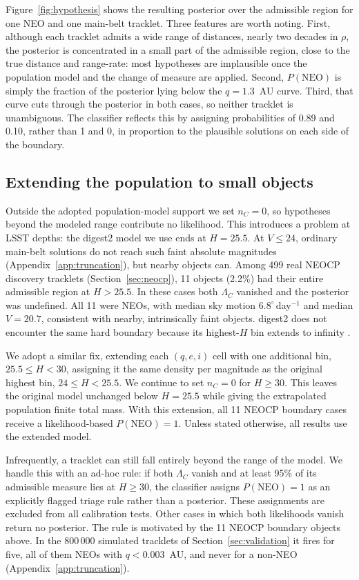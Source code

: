 \documentclass[linenumbers,twocolumn]{aastex701}
\begin{document}
Figure~\ref{fig:hypothesis} shows the resulting posterior over the
admissible region for one NEO and one main-belt tracklet. Three features
are worth noting. First, although each tracklet admits a wide range of
distances, nearly two decades in $\rho$, the posterior is concentrated in
a small part of the admissible region, close to the true distance and
range-rate: most hypotheses are implausible once the population model and
the change of measure are applied. Second, $P(\mathrm{NEO})$ is simply the
fraction of the posterior lying below the $q=1.3$~AU curve. Third, that
curve cuts through the posterior in both cases, so neither tracklet is
unambiguous. The classifier reflects this by assigning probabilities of
0.89 and 0.10, rather than 1 and 0, in proportion to the plausible
solutions on each side of the boundary.

\subsection{Extending the population to small objects}
\label{sec:truncation}

Outside the adopted population-model support we set $n_C=0$, so hypotheses beyond
the modeled range contribute no likelihood. This introduces a problem at LSST depths: the digest2 model we use ends at $H=25.5$.
At $V\le24$, ordinary main-belt solutions do not reach such faint absolute
magnitudes (Appendix~\ref{app:truncation}), but nearby objects can. Among 499
real NEOCP discovery tracklets (Section~\ref{sec:neocp}), 11 objects (2.2\%)
had their entire admissible region at $H>25.5$. In these cases both
$\Lambda_C$ vanished and the posterior was undefined. All 11 were NEOs, with
median sky motion $6.8^\circ$\,day$^{-1}$ and median $V=20.7$, consistent
with nearby, intrinsically faint objects. digest2 does not encounter the same
hard boundary because its highest-$H$ bin extends to infinity
\citep{keys2019}.

We adopt a similar fix, extending each $(q,e,i)$ cell with one additional bin,
$25.5\le H<30$, assigning it the same density per magnitude as the original
highest bin, $24\le H<25.5$. We continue to set $n_C=0$ for $H\ge30$. This
leaves the original model unchanged below $H=25.5$ while giving the
extrapolated population finite total mass. With this extension, all 11 NEOCP boundary
cases receive a likelihood-based $P(\mathrm{NEO})=1$. Unless stated
otherwise, all results use the extended model.
\medskip

Infrequently, a tracklet can still fall entirely beyond the range of the model. We handle this with an ad-hoc rule: if both
$\Lambda_C$ vanish and at least 95\% of its admissible measure lies at
$H\ge30$, the classifier assigns $P(\mathrm{NEO})=1$ as an explicitly flagged triage
rule rather than a posterior. These assignments are excluded from all
calibration tests. Other cases in which both likelihoods vanish return no
posterior. The rule is motivated by the 11 NEOCP boundary objects above. In
the 800\,000 simulated tracklets of Section~\ref{sec:validation} it fires for
five, all of them NEOs with $q<0.003$~AU, and never for a non-NEO
(Appendix~\ref{app:truncation}).
\end{document}
